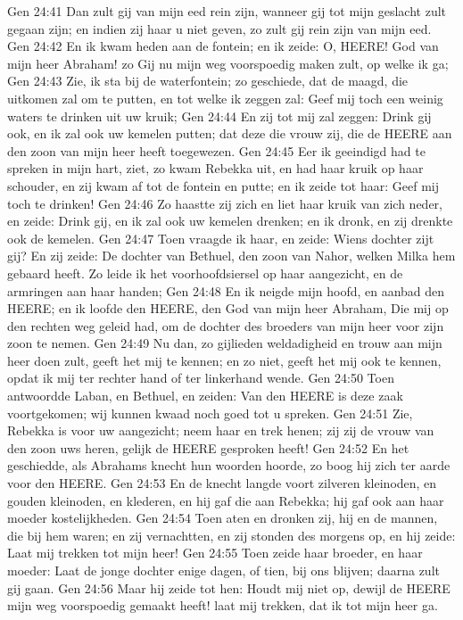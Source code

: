 Gen 24:41  Dan zult gij van mijn eed rein zijn, wanneer gij tot mijn geslacht zult gegaan zijn; en indien zij haar u niet geven, zo zult gij rein zijn van mijn eed.
Gen 24:42  En ik kwam heden aan de fontein; en ik zeide: O, HEERE! God van mijn heer Abraham! zo Gij nu mijn weg voorspoedig maken zult, op welke ik ga;
Gen 24:43  Zie, ik sta bij de waterfontein; zo geschiede, dat de maagd, die uitkomen zal om te putten, en tot welke ik zeggen zal: Geef mij toch een weinig waters te drinken uit uw kruik;
Gen 24:44  En zij tot mij zal zeggen: Drink gij ook, en ik zal ook uw kemelen putten; dat deze die vrouw zij, die de HEERE aan den zoon van mijn heer heeft toegewezen.
Gen 24:45  Eer ik geeindigd had te spreken in mijn hart, ziet, zo kwam Rebekka uit, en had haar kruik op haar schouder, en zij kwam af tot de fontein en putte; en ik zeide tot haar: Geef mij toch te drinken!
Gen 24:46  Zo haastte zij zich en liet haar kruik van zich neder, en zeide: Drink gij, en ik zal ook uw kemelen drenken; en ik dronk, en zij drenkte ook de kemelen.
Gen 24:47  Toen vraagde ik haar, en zeide: Wiens dochter zijt gij? En zij zeide: De dochter van Bethuel, den zoon van Nahor, welken Milka hem gebaard heeft. Zo leide ik het voorhoofdsiersel op haar aangezicht, en de armringen aan haar handen;
Gen 24:48  En ik neigde mijn hoofd, en aanbad den HEERE; en ik loofde den HEERE, den God van mijn heer Abraham, Die mij op den rechten weg geleid had, om de dochter des broeders van mijn heer voor zijn zoon te nemen.
Gen 24:49  Nu dan, zo gijlieden weldadigheid en trouw aan mijn heer doen zult, geeft het mij te kennen; en zo niet, geeft het mij ook te kennen, opdat ik mij ter rechter hand of ter linkerhand wende.
Gen 24:50  Toen antwoordde Laban, en Bethuel, en zeiden: Van den HEERE is deze zaak voortgekomen; wij kunnen kwaad noch goed tot u spreken.
Gen 24:51  Zie, Rebekka is voor uw aangezicht; neem haar en trek henen; zij zij de vrouw van den zoon uws heren, gelijk de HEERE gesproken heeft!
Gen 24:52  En het geschiedde, als Abrahams knecht hun woorden hoorde, zo boog hij zich ter aarde voor den HEERE.
Gen 24:53  En de knecht langde voort zilveren kleinoden, en gouden kleinoden, en klederen, en hij gaf die aan Rebekka; hij gaf ook aan haar moeder kostelijkheden.
Gen 24:54  Toen aten en dronken zij, hij en de mannen, die bij hem waren; en zij vernachtten, en zij stonden des morgens op, en hij zeide: Laat mij trekken tot mijn heer!
Gen 24:55  Toen zeide haar broeder, en haar moeder: Laat de jonge dochter enige dagen, of tien, bij ons blijven; daarna zult gij gaan.
Gen 24:56  Maar hij zeide tot hen: Houdt mij niet op, dewijl de HEERE mijn weg voorspoedig gemaakt heeft! laat mij trekken, dat ik tot mijn heer ga.

